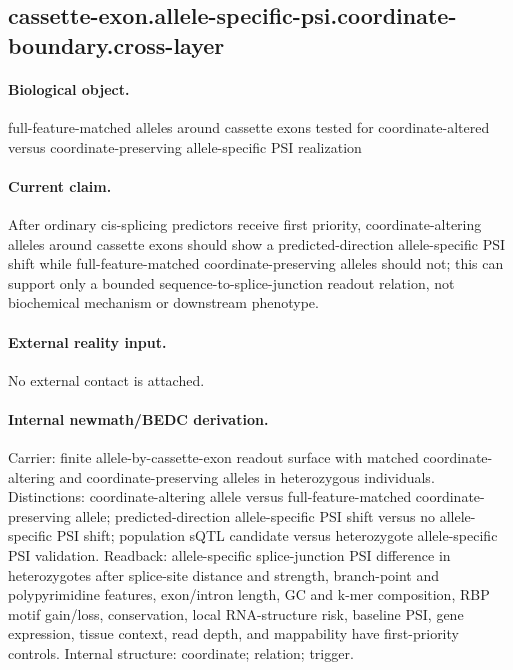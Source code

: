 \subsection{cassette-exon.allele-specific-psi.coordinate-boundary.cross-layer}

\paragraph{Biological object.} full-feature-matched alleles around cassette exons tested for coordinate-altered versus coordinate-preserving allele-specific PSI realization

\paragraph{Current claim.} After ordinary cis-splicing predictors receive first priority, coordinate-altering alleles around cassette exons should show a predicted-direction allele-specific PSI shift while full-feature-matched coordinate-preserving alleles should not; this can support only a bounded sequence-to-splice-junction readout relation, not biochemical mechanism or downstream phenotype.

\paragraph{External reality input.}
No external contact is attached.

\paragraph{Internal newmath/BEDC derivation.} Carrier: finite allele-by-cassette-exon readout surface with matched coordinate-altering and coordinate-preserving alleles in heterozygous individuals. Distinctions: coordinate-altering allele versus full-feature-matched coordinate-preserving allele; predicted-direction allele-specific PSI shift versus no allele-specific PSI shift; population sQTL candidate versus heterozygote allele-specific PSI validation. Readback: allele-specific splice-junction PSI difference in heterozygotes after splice-site distance and strength, branch-point and polypyrimidine features, exon/intron length, GC and k-mer composition, RBP motif gain/loss, conservation, local RNA-structure risk, baseline PSI, gene expression, tissue context, read depth, and mappability have first-priority controls. Internal structure: coordinate; relation; trigger.

